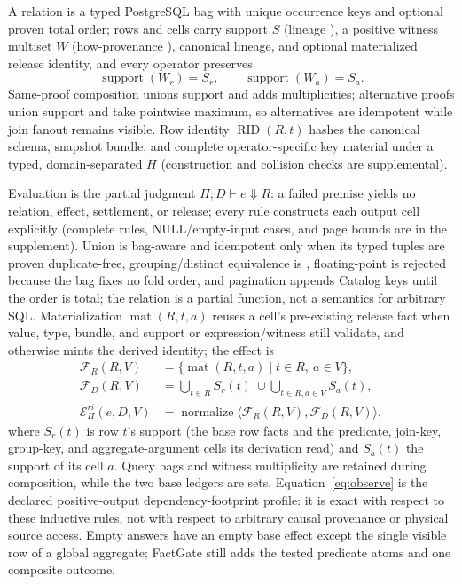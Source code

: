 \documentclass[10pt,journal,compsoc]{IEEEtran}
\newcommand{\system}{FactGate\xspace}
\newcommand{\code}[1]{\texttt{\detokenize{#1}}}
\newcommand{\facts}{\mathcal{F}}
\newcommand{\rieffect}{\mathcal{E}^{ri}}
\begin{document}
A relation is a typed PostgreSQL bag with unique occurrence keys and optional
proven total order; rows and cells carry support $S$ (lineage
\cite{cui2001lineage,buneman2001why}), a positive witness multiset $W$
(how-provenance \cite{green2007provenance}), canonical lineage, and optional
materialized release identity, and every operator preserves
\begin{equation}
 \operatorname{support}(W_r)=S_r,\qquad
 \operatorname{support}(W_a)=S_a.                 \label{eq:anninv}
\end{equation}
Same-proof composition unions support and adds multiplicities; alternative
proofs union support and take pointwise maximum, so alternatives are
idempotent while join fanout remains visible. Row identity
$\operatorname{RID}(R,t)$ hashes the canonical schema, snapshot bundle, and
complete operator-specific key material under a typed, domain-separated
$H$ (construction and collision checks are supplemental).

Evaluation is the partial judgment $\Pi;D\vdash e\Downarrow R$: a failed
premise yields no relation, effect, settlement, or release; every rule
constructs each output cell explicitly (complete rules, NULL/empty-input
cases, and page bounds are in the supplement). Union is bag-aware and idempotent only when its typed tuples are proven
duplicate-free, grouping/distinct equivalence is \code{IS NOT DISTINCT FROM},
floating-point \code{SUM} is rejected because the bag fixes no fold order,
and pagination appends Catalog keys until the order is total; the relation is
a partial function, not a semantics for arbitrary SQL.
Materialization $\operatorname{mat}(R,t,a)$ reuses a cell's pre-existing
release fact when value, type, bundle, and support or expression/witness
still validate, and otherwise mints the derived identity; the effect is
\begin{align}
\facts_R(R,V)&=\{\operatorname{mat}(R,t,a)\mid t\in R,\ a\in V\},\\
\facts_D(R,V)&=\bigcup_{t\in R}S_r(t)\ \cup
                \bigcup_{t\in R,a\in V}S_a(t),\\
\rieffect_\Pi(e,D,V)&=\operatorname{normalize}
  \langle\facts_R(R,V),\facts_D(R,V)\rangle,       \label{eq:observe}
\end{align}
where $S_r(t)$ is row $t$'s support (the base row facts and the predicate,
join-key, group-key, and aggregate-argument cells its derivation read) and
$S_a(t)$ the support of its cell $a$. Query bags and witness multiplicity
are retained during composition, while the two base ledgers are sets.
Equation~\eqref{eq:observe} is the declared
positive-output dependency-footprint profile: it is exact with respect to these
inductive rules, not with respect to arbitrary causal provenance or physical
source access.  Empty answers have an empty base effect except the single
visible row of a global aggregate; \system still adds the tested predicate
atoms and one composite outcome.
\end{document}
